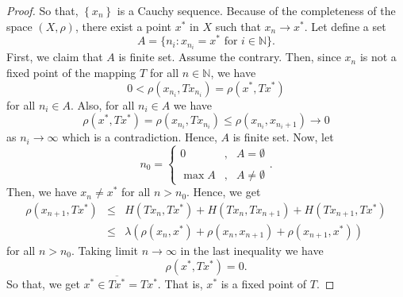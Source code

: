 \documentclass[10pt,a4paper]{amsart}
\begin{document}
\begin{proof}
So that, $\left \{ x_{n}\right \} $ is a Cauchy sequence. Because of the
completeness of the space $(X,\rho )$, there exist a point $x^{\ast }$ in $X$
such that $x_{n}\rightarrow x^{\ast }$. Let define a set 
\begin{equation*}
A=\{n_{i}:x_{n_{i}}=x^{\ast }\text{ for }i\in 
\mathbb{N}
\}.
\end{equation*}%
First, we claim that $A$ is finite set. Assume the contrary. Then, since $%
x_{n}$ is not a fixed point of the mapping $T$ for all $n\in 
\mathbb{N}
$, we have 
\begin{equation*}
0<\rho \left( x_{n_{i}},Tx_{n_{i}}\right) =\rho (x^{\ast },Tx^{\ast })
\end{equation*}%
for all $n_{i}\in A$. Also, for all $n_{i}\in A$ we have 
\begin{equation*}
\rho (x^{\ast },Tx^{\ast })=\rho \left( x_{n_{i}},Tx_{n_{i}}\right) \leq
\rho \left( x_{n_{i}},x_{n_{i}+1}\right) \rightarrow 0
\end{equation*}%
as $n_{i}\rightarrow \infty $ which is a contradiction. Hence, $A$ is finite
set. Now, let 
\begin{equation*}
n_{0}=\left \{ 
\begin{array}{ccc}
0 & , & A=\emptyset \\ 
&  &  \\ 
\max A & , & A\neq \emptyset%
\end{array}%
\right. .
\end{equation*}%
Then, we have $x_{n}\neq x^{\ast }$ for all $n>n_{0}$. Hence, we get 
\begin{eqnarray*}
\rho \left( x_{n+1},Tx^{\ast }\right) &\leq &H(Tx_{n},Tx^{\ast
})+H(Tx_{n},Tx_{n+1})+H(Tx_{n+1},Tx^{\ast }) \\
&\leq &\lambda (\rho (x_{n},x^{\ast })+\rho (x_{n},x_{n+1})+\rho
(x_{n+1},x^{\ast }))
\end{eqnarray*}%
for all $n>n_{0}$. Taking limit $n\rightarrow \infty $ in the last
inequality we have 
\begin{equation*}
\rho \left( x^{\ast },Tx^{\ast }\right) =0.
\end{equation*}%
So that, we get $x^{\ast }\in \overline{Tx^{\ast }}=Tx^{\ast }$. That is, $%
x^{\ast }$ is a fixed point of $T$.
\end{proof}
\end{document}
